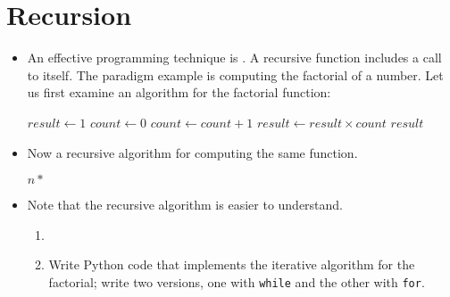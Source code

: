 \documentclass[a4paper]{article}
\begin{document}
{\begin{itemize}
\end{itemize}
\hrulefill

\section{Recursion}

\begin{itemize}

\item An effective programming technique is . A recursive
function includes a call to itself. The paradigm example is computing the
factorial of a number. Let us first examine an  algorithm for
the factorial function:

\begin{ucodeframe}
\vspace{1em}
\begin{algorithmic}
\State $result \gets 1$
\State $count \gets 0$
		\State $count \gets count + 1$
		\State $result \gets result \times count$
	\EndWhile
\State \Return $result$
\EndFunction
\end{algorithmic}
\end{ucodeframe}

\item Now a recursive algorithm for computing the same function.

\begin{ucodeframe}
\vspace{1em}
\begin{algorithmic}
\State {}
\Else
\State \Return $n*$ 
\EndIf
\EndFunction
\end{algorithmic}

\end{ucodeframe}
\item Note that the recursive algorithm is easier to understand. 

\begin{uexercise}
\begin{enumerate}
\item[]
\item Write Python code that implements the iterative algorithm for
the factorial; write two versions, one with \Verb+while+ and the other with
\Verb+for+.

\begin{hide}
\begin{usolution}
\begin{ucodeframe}
\end{ucodeframe}


\end{usolution}
\end{hide}
\end{enumerate}
\end{uexercise}
\end{itemize}}
\end{document}

